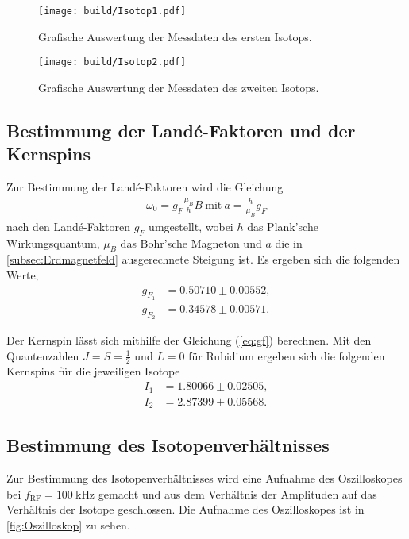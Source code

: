 \begin{figure}[H]
    \centering
    \texttt{[image: build/Isotop1.pdf]}
    \caption{Grafische Auswertung der Messdaten des ersten Isotops.}
    \label{fig:plot1}
\end{figure}

\begin{figure}[H]
    \centering
    \texttt{[image: build/Isotop2.pdf]}
    \caption{Grafische Auswertung der Messdaten des zweiten Isotops.}
    \label{fig:plot2}
\end{figure}

\subsection{Bestimmung der Landé-Faktoren und der Kernspins}
\label{subsec:lande}

Zur Bestimmung der Landé-Faktoren wird die Gleichung 
\begin{align}
    \omega_0=g_F\frac{\mu_B}{h}B\ \text{mit}\ a=\frac{h}{\mu_B}g_F
\end{align}
nach den Landé-Faktoren $g_F$ umgestellt, wobei $h$ das Plank'sche Wirkungsquantum, $\mu_B$ das Bohr'sche Magneton und $a$ die in \autoref{subsec:Erdmagnetfeld} ausgerechnete Steigung ist.
Es ergeben sich die folgenden Werte,
\begin{align*}
    g_{F_1} &= 0.50710 \pm 0.00552, \\
    g_{F_2} &= 0.34578 \pm 0.00571.
\end{align*}

\noindent
Der Kernspin lässt sich mithilfe der Gleichung (\ref{eq:gf}) berechnen. Mit den Quantenzahlen $J=S=\frac 12$ und $L=0$ für Rubidium \cite{Anleitung21} ergeben sich die folgenden
Kernspins für die jeweiligen Isotope
\begin{align*}
    I_1 &= 1.80066 \pm 0.02505, \\
    I_2 &= 2.87399 \pm 0.05568.
\end{align*}

\subsection{Bestimmung des Isotopenverhältnisses}
\label{subsec:isotopenverhaeltnis}

Zur Bestimmung des Isotopenverhältnisses wird eine Aufnahme des Oszilloskopes bei $f_{\text{RF}} = \SI{100}{\kilo\hertz}$ gemacht und aus dem Verhältnis der Amplituden auf das
Verhältnis der Isotope geschlossen. Die Aufnahme des Oszilloskopes ist in \autoref{fig:Oszilloskop} zu sehen.

